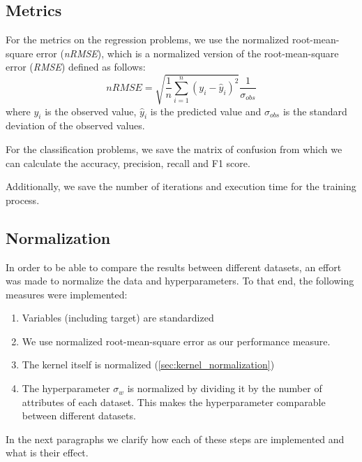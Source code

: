 
\subsection{Metrics}
\label{sec:metrics}

For the metrics on the regression problems,
we use the normalized root-mean-square error (\emph{nRMSE}),
which is a normalized version of the root-mean-square error (\emph{RMSE})
defined as follows:
\begin{equation}
    nRMSE = \sqrt{\frac{1}{n}\sum_{i=1}^n (y_i - \hat{y}_i)^2}\frac{1}{\sigma_{obs}}
\end{equation}
where $y_i$ is the observed value, $\hat{y}_i$ is the predicted value and
$\sigma_{obs}$ is the standard deviation of the observed values.

For the classification problems, we save the matrix of confusion from which we
can calculate the accuracy, precision, recall and F1 score.

Additionally, we save the number of iterations and execution time for the
training process.

\subsection{Normalization}%
\label{sec:normalization}

In order to be able to compare the results between different datasets, an effort
was made to normalize the data and hyperparameters. To that end, the following
measures were implemented:

\begin{enumerate}
    \item Variables (including target) are standardized
    \item We use normalized root-mean-square error as our performance
          measure.
    \item The kernel itself is normalized (\cref{sec:kernel_normalization})
    \item The hyperparameter $\sigma_w$ is normalized by dividing it by the
          number of attributes of each dataset. This makes the hyperparameter
          comparable between different datasets.
\end{enumerate}

In the next paragraphs we clarify how each of these steps are implemented and
what is their effect.

